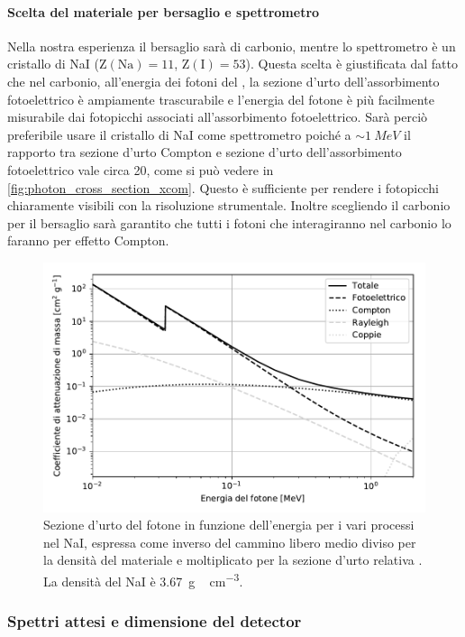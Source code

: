  \paragraph{Scelta del materiale per bersaglio e spettrometro}
 Nella nostra esperienza il bersaglio sarà di carbonio, mentre lo spettrometro è un cristallo di NaI ($\text{Z}(\text{Na})=11$, $\text{Z}(\text{I})=53$). Questa scelta è giustificata dal fatto che nel carbonio, all'energia dei fotoni del \co{}, la sezione d'urto dell'assorbimento fotoelettrico è ampiamente trascurabile e l'energia del fotone è più facilmente misurabile dai fotopicchi associati all'assorbimento fotoelettrico. Sarà perciò preferibile usare il cristallo di NaI come spettrometro poiché a $\sim\SI{1}{MeV}$ il rapporto tra sezione d'urto Compton e sezione d'urto dell'assorbimento fotoelettrico vale circa 20, come si può vedere in \autoref{fig:photon_cross_section_xcom}. Questo è sufficiente per rendere i fotopicchi chiaramente visibili con la risoluzione strumentale. Inoltre scegliendo il carbonio per il bersaglio  sarà garantito che tutti i fotoni che interagiranno nel carbonio lo faranno per effetto Compton.
  
  \begin{figure}[h]
 	\centering
 	\includegraphics[width=33em]{cross}
 	\caption{\label{fig:photon_cross_section_xcom}
	Sezione d'urto del fotone in funzione dell'energia per i vari processi nel NaI,
	espressa come inverso del cammino libero medio diviso per la densità del materiale
	e moltiplicato per la sezione d'urto relativa \cite{5}. La densità del NaI è \SI{3.67}{g\,cm^{-3}}.}
 \end{figure}
 \subsubsection{Spettri attesi e dimensione del detector}
